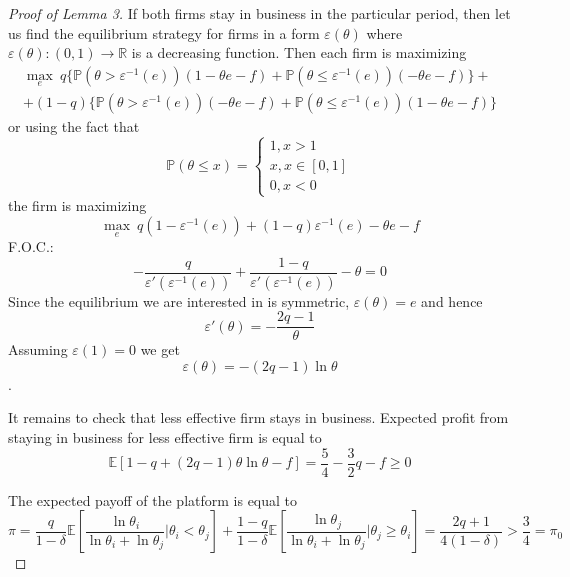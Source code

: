 \documentclass[a4paper]{article}
\newcommand{\prob}{\mathbb{P}}
\newcommand{\expect}{\mathbb{E}}
\begin{document}
\begin{proof}[Proof of Lemma 3]
	
	
	
	
	
	
	If both firms stay in business in the particular period, then let us find the equilibrium strategy for firms in a form $\varepsilon(\theta)$ where $\varepsilon(\theta):(0, 1) \to \mathbb{R}$ is a decreasing function. Then each firm is maximizing 
	\begin{align*}\underset{e}{\max}\ q\{\prob(\theta > \varepsilon^{-1}(e))(1 - \theta e - f) + \prob(\theta \le \varepsilon^{-1}(e))(-\theta e - f)\} +\\+ (1-q)\{\prob(\theta > \varepsilon^{-1}(e))(-\theta e - f) + \prob(\theta \le \varepsilon^{-1}(e))(1 - \theta e - f)\}
	\end{align*}
	or using the fact that $$\prob(\theta \le x) = \begin{cases}
	1, x > 1\\
	x, x \in [0, 1]\\
	0, x < 0
	\end{cases}$$
	the firm is maximizing 
	$$\underset{e}{\max}\ q(1 - \varepsilon^{-1}(e)) + (1 - q)\varepsilon^{-1}(e) - \theta e - f$$
	F.O.C.: $$-\frac{q}{\varepsilon'(\varepsilon^{-1}(e))} + \frac{1-q}{\varepsilon'(\varepsilon^{-1}(e))} - \theta = 0$$
	Since the equilibrium we are interested in is symmetric, $\varepsilon(\theta) = e$ and hence
	$$\varepsilon'(\theta) = -\frac{2q - 1}{\theta}$$
	Assuming $\varepsilon(1) = 0$ we get $$\varepsilon(\theta) = -(2q - 1)\ln\theta$$.
	
	It remains to check that less effective firm stays in business. Expected profit from staying in business for less effective firm is equal to
	$$\expect[1-q + (2q-1) \theta \ln \theta - f] = \frac{5}{4} - \frac{3}{2}q - f \ge 0$$
	
	
	
	The expected payoff of the platform is equal to
	$$\pi = \frac{q}{1-\delta} \expect\left[\frac{\ln \theta_i}{\ln \theta_i + \ln \theta_j}\bigg| \theta_i < \theta_j\right] +\frac{1-q}{1-\delta}\expect\left[\frac{\ln \theta_j}{\ln \theta_i + \ln \theta_j}\bigg| \theta_j \ge \theta_i\right] = \frac{2q+1}{4(1 - \delta)} > \frac{3}{4} = \pi_0$$
\end{proof}
\end{document}
